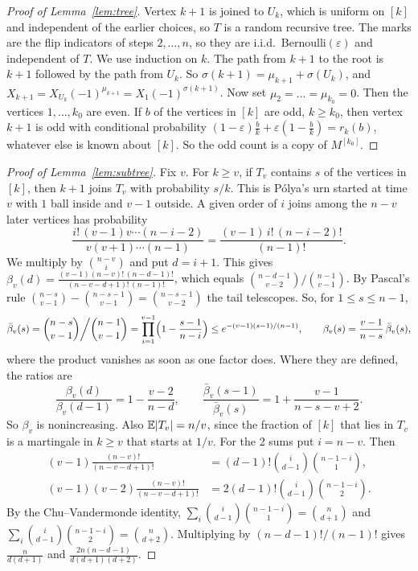 \begin{proof}[Proof of Lemma~\ref{lem:tree}]
Vertex $k+1$ is joined to $U_k$, which is uniform on $[k]$ and independent
of the earlier choices, so $T$ is a random recursive tree. The marks are the
flip indicators of steps $2,\dots,n$, so they are i.i.d.\
Bernoulli$(\varepsilon)$ and independent of $T$. We use induction on $k$.
The path from $k+1$ to the root is $k+1$ followed by the path from $U_k$.
So $\sigma(k+1)=\mu_{k+1}+\sigma(U_k)$, and
$X_{k+1}=X_{U_k}(-1)^{\mu_{k+1}}=X_1(-1)^{\sigma(k+1)}$. Now set
$\mu_2=\dots=\mu_{k_0}=0$. Then the vertices $1,\dots,k_0$ are even. If $b$
of the vertices in $[k]$ are odd, $k\ge k_0$, then vertex $k+1$ is odd with
conditional probability $(1-\varepsilon)\frac bk+\varepsilon(1-\frac bk)=r_k(b)$,
whatever else is known about $[k]$. So the odd count is a copy of
$M^{[k_0]}$.
\end{proof}

\begin{proof}[Proof of Lemma~\ref{lem:subtree}]
Fix $v$. For $k\ge v$, if $T_v$ contains $s$ of the vertices in $[k]$, then
$k+1$ joins $T_v$ with probability $s/k$. This is P\'olya's urn started at
time $v$ with $1$ ball inside and $v-1$ outside. A given order of $i$ joins
among the $n-v$ later vertices has probability
\[
 \frac{i!\,(v-1)v\cdots(n-i-2)}{v(v+1)\cdots(n-1)}
 =\frac{(v-1)\,i!\,(n-i-2)!}{(n-1)!}.
\]
We multiply by $\binom{n-v}{i}$ and put $d=i+1$. This gives
$\beta_v(d)=\frac{(v-1)(n-v)!\,(n-d-1)!}{(n-v-d+1)!\,(n-1)!}$, which equals
$\binom{n-d-1}{v-2}/\binom{n-1}{v-1}$. By Pascal's rule
$\binom{n-s}{v-1}-\binom{n-s-1}{v-1}=\binom{n-s-1}{v-2}$ the tail
telescopes. So, for $1\le s\le n-1$,
\begin{equation}\label{eq:B-subtail}
 \bar\beta_v(s)=\binom{n-s}{v-1}\bigg/\binom{n-1}{v-1}
 =\prod_{i=1}^{v-1}\Bigl(1-\frac{s-1}{n-i}\Bigr)\le e^{-(v-1)(s-1)/(n-1)},
 \qquad\beta_v(s)=\frac{v-1}{n-s}\,\bar\beta_v(s),
\end{equation}
where the product vanishes as soon as one factor does. Where they are
defined, the ratios are
\begin{equation}\label{eq:B-ratio}
 \frac{\beta_v(d)}{\beta_v(d-1)}=1-\frac{v-2}{n-d},\qquad
 \frac{\bar\beta_v(s-1)}{\bar\beta_v(s)}=1+\frac{v-1}{n-s-v+2}.
\end{equation}
So $\beta_v$ is nonincreasing. Also $\mathbb{E}\lvert T_v\rvert=n/v$, since the
fraction of $[k]$ that lies in $T_v$ is a martingale in $k\ge v$ that
starts at $1/v$. For the 2 sums put $i=n-v$. Then
\begin{align*}
 (v-1)\frac{(n-v)!}{(n-v-d+1)!}&=(d-1)!\binom{i}{d-1}\binom{n-1-i}{1},\\
 (v-1)(v-2)\frac{(n-v)!}{(n-v-d+1)!}&=2(d-1)!\binom{i}{d-1}\binom{n-1-i}{2}.
\end{align*}
By the Chu--Vandermonde identity,
$\sum_i\binom{i}{d-1}\binom{n-1-i}{1}=\binom{n}{d+1}$ and
$\sum_i\binom{i}{d-1}\binom{n-1-i}{2}=\binom{n}{d+2}$. Multiplying by
$(n-d-1)!/(n-1)!$ gives $\frac{n}{d(d+1)}$ and
$\frac{2n(n-d-1)}{d(d+1)(d+2)}$.
\end{proof}

